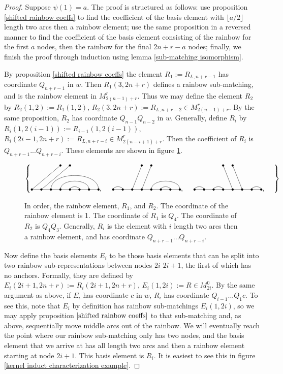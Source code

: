 \documentclass{amsart}
\begin{document}
 
 \begin{proof}
 	Suppose $\psi(1)=a$. The proof is structured as follows: use proposition \ref{shifted rainbow coeffs} to find the coefficient of the basis element with $\lfloor a/2\rfloor$ length two arcs then a rainbow element; use the same proposition in a reversed manner to find the coefficient of the basis element consisting of the rainbow for the first $a$ nodes, then the rainbow for the final $2n+r-a$ nodes; finally, we finish the proof through induction using lemma \ref{sub-matching isomorphism}.
 	
 	\vspace{2mm}
 	By proposition \ref{shifted rainbow coeffs} the element $R_1:=R_{L,n+r-1}$ has coordinate $Q_{n+r-1}$ in $w$. Then $R_1(3,2n+r)$ defines a rainbow sub-matching, and is the rainbow element in  $M_{2(n-1)+r}^r$. Thus we may define the element $R_2$ by $R_2(1,2):=R_1(1,2)$, $R_2(3,2n+r):=R_{L,n+r-2}\in M_{2(n-1)+r}^r$. By the same proposition, $R_2$ has coordinate $Q_{n-1}Q_{n-2}$ in $w$. Generally, define $R_i$ by $R_i(1,2(i-1)):=R_{i-1}(1,2(i-1))$, $R_i(2i-1,2n+r):=R_{L,n+r-i}\in M_{2(n-i+1)+r}^r$. Then the coefficient of $R_i$ is $Q_{n+r-1}...Q_{n+r-i}$. These elements are shown in figure \ref{hump the rainbow}.
 	
 	\begin{figure}
 		\def\cbasisspacing{5mm}
 		
 		$\cbr{
 			\begin{gathered}
 			\GeneralizedMatching{8}{3/8, 4/7,5/6}{2}{1/1,2/2}{5/4}, \hspace{\cbasisspacing}
 			\GeneralizedMatching{8}{1/2, 5/8,6/7}{2}{3/1,4/2}{5/4}, 
 			\hspace{\cbasisspacing}
 			\GeneralizedMatching{8}{1/2, 3/4,7/8}{2}{5/1,6/2}{5/4}, \hspace{\cbasisspacing}
 			\end{gathered}}$ 
 		\caption{In order, the rainbow element, $R_1$, and $R_2$. The coordinate of the rainbow element is 1. The coordinate of $R_1$ is $Q_{4}$. The coordinate of $R_2$ is $Q_4Q_3$. Generally, $R_i$ is the element with $i$ length two arcs then a rainbow element, and has coordinate $Q_{n+r-1}...Q_{n+r-i}$.}
 		\label{hump the rainbow}
 	\end{figure}
 	
 	Now define the basis elements $E_i$ to be those basis elements that can be split into two rainbow sub-representations between nodes $2i$ $2i+1$, the first of which has no anchors. Formally, they are defined by $E_i(2i+1,2n+r):=R_i(2i+1,2n+r)$, $E_i(1,2i):=R\in M_{2i}^0$. By the same argument as above, if $E_i$ has coordinate $c$ in $w$, $R_i$ has coordinate $Q_{i-1}...Q_{1}c$. To see this, note that $E_i$ by definition has rainbow sub-matchings $E_i(1,2i)$, so we may apply proposition $\ref{shifted rainbow coeffs}$ to that sub-matching and, as above, sequentially move middle arcs out of the rainbow. We will eventually reach the point where our rainbow sub-matching only has two nodes, and the basis element that we arrive at has all length two arcs and then a rainbow element starting at node $2i+1$. This basis element is $R_i$. It is easiest to see this in figure \ref{kernel induct characterization example}.
 	

\end{proof}
\end{document}
